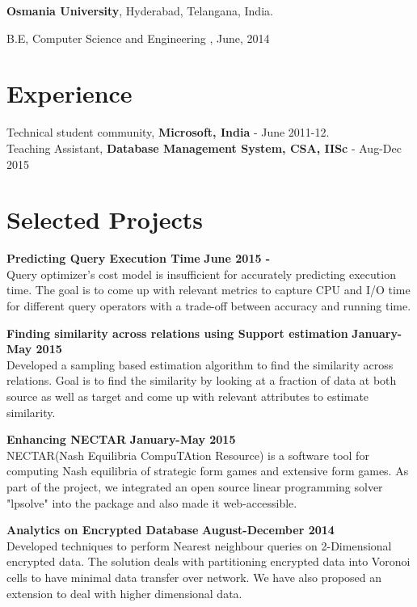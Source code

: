 \documentclass[margin,line]{res}
\newenvironment{list1}{
  \begin{list}{\ding{113}}{%
      \setlength{\itemsep}{0in}
      \setlength{\parsep}{0in} \setlength{\parskip}{0in}
      \setlength{\topsep}{0in} \setlength{\partopsep}{0in} 
      \setlength{\leftmargin}{0.17in}}}{\end{list}}
\begin{document}
\begin{resume}
{\bf Osmania University}, Hyderabad, Telangana, India.\\
\vspace*{-.1in}
\begin{list1}
\item[] B.E, Computer Science and Engineering ,  June, 2014
\end{list1}
\section{\sc Experience}

Technical student community, {\bf Microsoft, India} - June 2011-12.\\
Teaching Assistant,  {\bf Database Management System, CSA, IISc} - Aug-Dec 2015
\section{\sc Selected Projects}
{\bf Predicting Query Execution Time}
\hfill {\bf June 2015  - }\\
Query optimizer's cost model is insufficient for accurately predicting execution time. The goal is to come up with relevant metrics to capture CPU and I/O time for different query operators with a trade-off between accuracy and running time. 

{\bf Finding similarity across relations using Support estimation}
\hfill {\bf January-May 2015}\\
Developed a sampling based estimation algorithm to find the similarity across relations. Goal is to find the similarity by looking at a fraction of data at both source as well as target and come up with relevant attributes to estimate similarity. 

{\bf Enhancing NECTAR}
\hfill {\bf  January-May 2015}\\
NECTAR(Nash Equilibria CompuTAtion Resource) is a software tool for computing Nash equilibria of strategic form games and extensive form games. As part of the project, we integrated an open source linear programming solver "lpsolve" into the package and also made it web-accessible.

{\bf Analytics on Encrypted Database}
\hfill {\bf  August-December 2014}\\
Developed techniques to perform Nearest neighbour queries on 2-Dimensional encrypted data. The solution deals with partitioning encrypted  data into Voronoi cells to have minimal data transfer over network. We have also proposed an extension to deal with higher dimensional data.


\end{resume}
\end{document}
